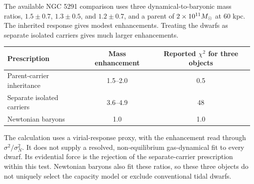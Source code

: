 The available NGC 5291 comparison uses three dynamical-to-baryonic mass
ratios, $1.5\pm0.7$, $1.3\pm0.5$, and $1.2\pm0.7$, and a parent of
$2\times10^{11}M_\odot$ at 60 kpc. The inherited response gives modest
enhancements. Treating the dwarfs as separate isolated carriers gives
much larger enhancements. \cite{lelli}
\begin{center}
\begin{tabular}{lcc}
\toprule
Prescription & Mass enhancement & Reported $\chi^2$ for three objects\\
\midrule
Parent-carrier inheritance & 1.5--2.0 & 0.5\\
Separate isolated carriers & 3.6--4.9 & 48\\
Newtonian baryons & 1.0 & 1.0\\
\bottomrule
\end{tabular}
\end{center}
The calculation uses a virial-response proxy, with the enhancement read
through $\sigma^2/\sigma_N^2$. It does not supply a resolved,
non-equilibrium gas-dynamical fit to every dwarf. Its evidential force is
the rejection of the separate-carrier prescription within this test.
Newtonian baryons also fit these ratios, so these three objects do not
uniquely select the capacity model or exclude conventional tidal dwarfs.
